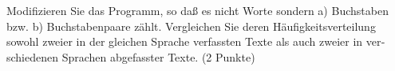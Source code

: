 Mod­i­fizieren Sie das Pro­gramm, so daß es nicht Worte son­dern a) Buch­staben 
bzw.​ b) Buch­staben­paare zählt.​ Vergle­ichen Sie deren Häufigkeitsverteilung 
sowohl zweier in der gle­ichen Sprache ver­fassten Texte als auch zweier in 
ver­schiede­nen Sprachen abge­fasster Texte.​ (2 Punk­te)
